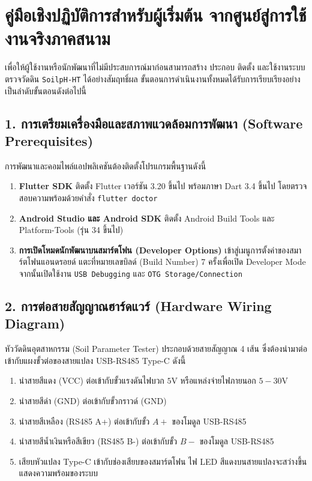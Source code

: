\section{คู่มือเชิงปฏิบัติการสำหรับผู้เริ่มต้น จากศูนย์สู่การใช้งานจริงภาคสนาม}

เพื่อให้ผู้ใช้งานหรือนักพัฒนาที่ไม่มีประสบการณ์มาก่อนสามารถสร้าง ประกอบ ติดตั้ง และใช้งานระบบตรวจวัดดิน \texttt{SoilpH-HT} ได้อย่างสัมฤทธิ์ผล ขั้นตอนการดำเนินงานทั้งหมดได้รับการเรียบเรียงอย่างเป็นลำดับขั้นตอนดังต่อไปนี้

\subsection{1. การเตรียมเครื่องมือและสภาพแวดล้อมการพัฒนา (Software Prerequisites)}
การพัฒนาและคอมไพล์แอปพลิเคชันต้องติดตั้งโปรแกรมพื้นฐานดังนี้
\begin{enumerate}
    \item \textbf{Flutter SDK} ติดตั้ง Flutter เวอร์ชัน 3.20 ขึ้นไป พร้อมภาษา Dart 3.4 ขึ้นไป โดยตรวจสอบความพร้อมด้วยคำสั่ง \texttt{flutter doctor}
    \item \textbf{Android Studio และ Android SDK} ติดตั้ง Android Build Tools และ Platform-Tools (รุ่น 34 ขึ้นไป)
    \item \textbf{การเปิดโหมดนักพัฒนาบนสมาร์ตโฟน (Developer Options)} เข้าสู่เมนูการตั้งค่าของสมาร์ตโฟนแอนดรอยด์ แตะที่หมายเลขบิลด์ (Build Number) 7 ครั้งเพื่อเปิด Developer Mode จากนั้นเปิดใช้งาน \texttt{USB Debugging} และ \texttt{OTG Storage/Connection}
\end{enumerate}

\subsection{2. การต่อสายสัญญาณฮาร์ดแวร์ (Hardware Wiring Diagram)}
หัววัดดินอุตสาหกรรม (Soil Parameter Tester) ประกอบด้วยสายสัญญาณ 4 เส้น ซึ่งต้องนำมาต่อเข้ากับแผงขั้วต่อของสายแปลง USB-RS485 Type-C ดังนี้
\begin{enumerate}
    \item นำสายสีแดง (VCC) ต่อเข้ากับขั้วแรงดันไฟบวก $5\text{V}$ หรือแหล่งจ่ายไฟภายนอก $5 - 30\text{V}$
    \item นำสายสีดำ (GND) ต่อเข้ากับขั้วกราวด์ (GND)
    \item นำสายสีเหลือง (RS485 A+) ต่อเข้ากับขั้ว $A+$ ของโมดูล USB-RS485
    \item นำสายสีน้ำเงินหรือสีเขียว (RS485 B-) ต่อเข้ากับขั้ว $B-$ ของโมดูล USB-RS485
    \item เสียบหัวแปลง Type-C เข้ากับช่องเสียบของสมาร์ตโฟน ไฟ LED สีแดงบนสายแปลงจะสว่างขึ้นแสดงความพร้อมของระบบ
\end{enumerate}

